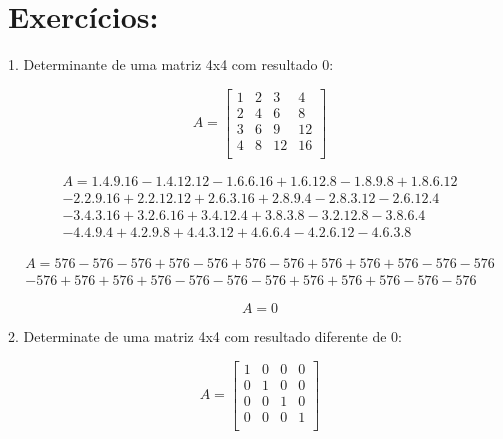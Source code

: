 \documentclass{article}
\begin{document}
\section {Exercícios:}

1. Determinante de uma matriz 4x4 com resultado 0:\newline

\[
A = 
\left[
    \begin{array}{cccc}
        1 & 2 & 3 & 4 \\
        2 & 4 & 6 & 8 \\
        3 & 6 & 9 & 12\\
        4 & 8 & 12 & 16\\
    \end{array}
\right]
\]

\begin{equation*}
\begin{split}
    A = 1.4.9.16 - 1.4.12.12 - 1.6.6.16 + 1.6.12.8 - 1.8.9.8 + 1.8.6.12\\ 
    - 2.2.9.16 + 2.2.12.12 + 2.6.3.16 + 2.8.9.4- 2.8.3.12 - 2.6.12.4\\
    - 3.4.3.16 + 3.2.6.16 + 3.4.12.4 + 3.8.3.8 - 3.2.12.8 - 3.8.6.4\\ 
    - 4.4.9.4 + 4.2.9.8 + 4.4.3.12 + 4.6.6.4 - 4.2.6.12 - 4.6.3.8
\end{split}
\end{equation*}

\begin{equation*}
\begin{split}
    A = 576 - 576 - 576 + 576 - 576 + 576 - 576 + 576 + 576 + 576 - 576 - 576\\
    - 576 + 576 + 576 + 576 - 576 - 576 - 576 + 576 + 576 + 576 - 576 - 576 
\end{split}
\end{equation*}

\[
A = 0
\]

\newpage

2. Determinate de uma matriz 4x4 com resultado diferente de 0:\newline

\[
A = 
\left[
    \begin{array}{cccc}
        1 & 0 & 0 & 0 \\
        0 & 1 & 0 & 0 \\
        0 & 0 & 1 & 0\\
        0 & 0 & 0 & 1\\
    \end{array}
\right]
\]
\end{document}
